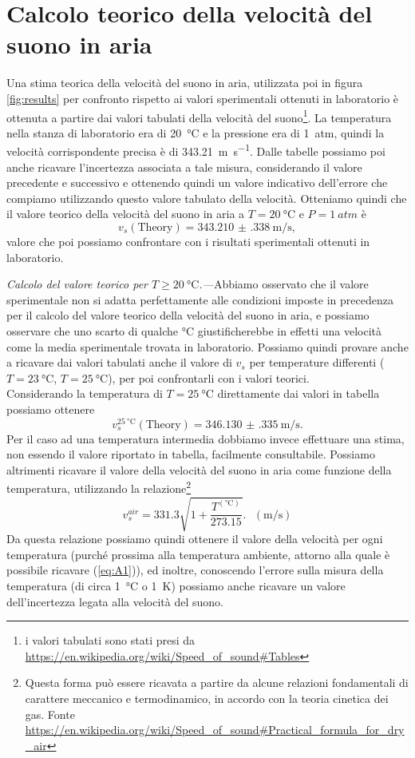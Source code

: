 \documentclass[
    rmp,
    reprint, 
    superscriptaddress, 
    altaffilletter, 
    amsmath, 
    amssymb, 
    a4paper,
    varvw]{revtex4-2}
\begin{document}
\section{Calcolo teorico della velocità del suono in aria}\label{sec:appendix_A}
Una stima teorica della velocità del suono in aria, utilizzata poi in figura \ref{fig:results} per confronto rispetto ai valori sperimentali ottenuti in laboratorio è ottenuta a partire dai valori tabulati della velocità del suono\footnote{i valori tabulati sono stati presi da \url{https://en.wikipedia.org/wiki/Speed_of_sound\#Tables}}. La temperatura nella stanza di laboratorio era di \SI{20}{\celsius} e la pressione era di \SI{1}{atm}, quindi la velocità corrispondente precisa è di \SI{343.21}{\metre\per\second}. Dalle tabelle possiamo poi anche ricavare l'incertezza associata a tale misura, considerando il valore precedente e successivo e ottenendo quindi un valore indicativo dell'errore che compiamo utilizzando questo valore tabulato della velocità. Otteniamo quindi che il valore teorico della velocità del suono in aria a $T=\SI{20}{\celsius}$ e $P=\SI{1}{atm}$ è \[v_s(\text{Theory}) = \SI{343.210(338)}{\metre\per\second},\] valore che poi possiamo confrontare con i risultati sperimentali ottenuti in laboratorio. 

\noindent\textit{Calcolo del valore teorico per $T \geq \SI{20}{\celsius}$.---}Abbiamo osservato che il valore sperimentale non si adatta perfettamente alle condizioni imposte in precedenza per il calcolo del valore teorico della velocità del suono in aria, e possiamo osservare che uno scarto di qualche \si[]{\celsius} giustificherebbe in effetti una velocità come la media sperimentale trovata in laboratorio. Possiamo quindi provare anche a ricavare dai valori tabulati anche il valore di $v_s$ per temperature differenti ($T=\SI{23}{\celsius}$, $T=\SI{25}{\celsius}$), per poi confrontarli con i valori teorici. \\
Considerando la temperatura di $T=\SI{25}{\celsius}$ direttamente dai valori in tabella possiamo ottenere \[v_s^{\SI{25}{\celsius}}(\text{Theory})=\SI{346.130(335)}{\metre\per\second}.\] 
Per il caso ad una temperatura intermedia dobbiamo invece effettuare una stima, non essendo il valore riportato in tabella, facilmente consultabile. 
Possiamo altrimenti ricavare il valore della velocità del suono in aria come funzione della temperatura, utilizzando la relazione\footnote{Questa forma può essere ricavata a partire da alcune relazioni fondamentali di carattere meccanico e termodinamico, in accordo con la teoria cinetica dei gas. Fonte \url{https://en.wikipedia.org/wiki/Speed_of_sound\#Practical_formula_for_dry_air}}\begin{equation}v_s^{air} = 331.3\sqrt{1+\frac{T^{(\si{\celsius})}}{273.15}}.~~~(\si{\metre\per\second})\label{eq:A1}\end{equation} Da questa relazione possiamo quindi ottenere il valore della velocità per ogni temperatura (purché prossima alla temperatura ambiente, attorno alla quale è possibile ricavare (\ref{eq:A1})), ed inoltre, conoscendo l'errore sulla misura della temperatura (di circa \SI{1}{\celsius} o \SI{1}{\kelvin}) possiamo anche ricavare un valore dell'incertezza legata alla velocità del suono. 
\end{document}
